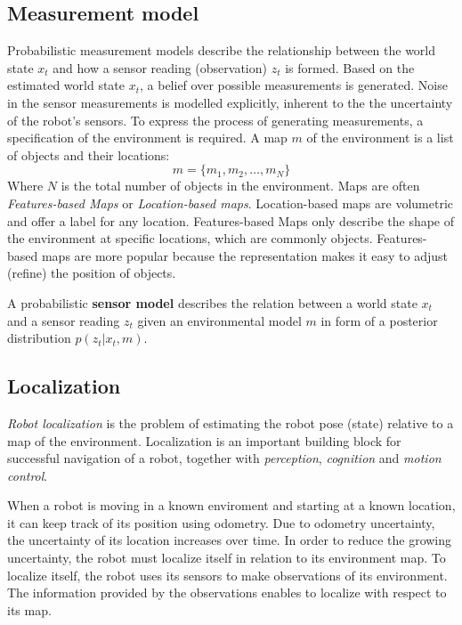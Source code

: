 		\subsection{Measurement model}
		\label{sec:measurement_model}
Probabilistic measurement models describe the relationship between the world state $x_t$ and how a sensor reading (observation) $z_t$ is formed.
Based on the estimated world state $x_t$, a belief over possible measurements is generated.
Noise in the sensor measurements is modelled explicitly, inherent to the the uncertainty of the robot's sensors.
To express the process of generating measurements, a specification of the environment is required.
A map $m$ of the environment is a list of objects and their locations:
\begin{equation}
m = \{m_1, m_2, \hdots, m_N\}
\end{equation}
Where $N$ is the total number of objects in the environment.
Maps are often \textit{Features-based Maps} or \textit{Location-based maps}.
Location-based maps are volumetric and offer a label for any location.
Features-based Maps only describe the shape of the environment at specific locations, which are commonly objects.
Features-based maps are more popular because the representation makes it easy to adjust (refine) the position of objects.
\begin{mydef}
A probabilistic \textbf{sensor model} describes the relation between a world state $x_t$ and a sensor reading $z_t$ given an environmental model $m$ in form of a posterior distribution $p (z_t | x_t, m)$.
\end{mydef}


		\subsection{Localization}
\textit{Robot localization} is the problem of estimating the robot pose (state) relative to a map of the environment.
Localization is an important building block for successful navigation of a robot, together with \textit{perception}, \textit{cognition} and \textit{motion control}.

When a robot is moving in a known enviroment and starting at a known location, it can keep track of its position using odometry.
Due to odometry uncertainty, the uncertainty of its location increases over time.
In order to reduce the growing uncertainty, the robot must localize itself in relation to its environment map.
To localize itself, the robot uses its sensors to make observations of its environment.
The information provided by the observations enables to localize with respect to its map.

